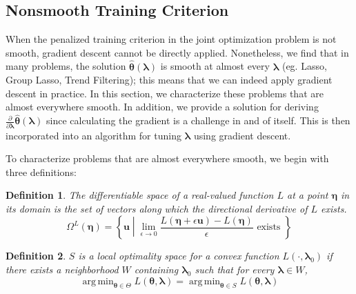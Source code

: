 \documentclass[12pt]{article}
\newtheorem{definition}{Definition}
\DeclareMathOperator*{\argmin}{arg\,min}
\begin{document}
\subsection{Nonsmooth Training Criterion}
When the penalized training criterion in the joint optimization problem is not smooth, gradient descent cannot be directly applied. Nonetheless, we find that in many problems, the solution $\hat{\boldsymbol \theta}\left(\boldsymbol{\lambda}\right)$ is smooth at almost every $\boldsymbol{\lambda}$ (eg. Lasso, Group Lasso, Trend Filtering); this means that we can indeed apply gradient descent in practice. In this section, we characterize these problems that are almost everywhere smooth. In addition, we provide a solution for deriving $\frac{\partial}{\partial \boldsymbol{\lambda}} \hat{\boldsymbol \theta}(\boldsymbol{\lambda})$ since calculating the gradient is a challenge in and of itself. This is then incorporated into an algorithm for tuning $\boldsymbol{\lambda}$ using gradient descent.

To characterize problems that are almost everywhere smooth, we begin with three definitions:
\begin{definition}
The differentiable space of a real-valued function $L$ at a point $\boldsymbol \eta$ in its domain is the set of vectors along which the directional derivative of $L$ exists.
\begin{equation}
\Omega^{L}(\boldsymbol \eta) = \left \{ \boldsymbol u \middle | \lim_{\epsilon \rightarrow 0} \frac{L(\boldsymbol \eta + \epsilon \boldsymbol u) - L(\boldsymbol \eta)}{\epsilon} \text{ exists } \right \}
\end{equation}
\end{definition}

\begin{definition}
$S$ is a local optimality space for a convex function $L(\cdot, \boldsymbol \lambda_0)$ if there exists a neighborhood $W$ containing $\boldsymbol \lambda_0$ such that for every $\boldsymbol \lambda \in W$,
\begin{equation}
\argmin_{\boldsymbol \theta \in \Theta} L(\boldsymbol \theta, \boldsymbol \lambda) =
\argmin_{\boldsymbol \theta \in S} L(\boldsymbol \theta, \boldsymbol \lambda)
\end{equation}
\end{definition}
\end{document}
